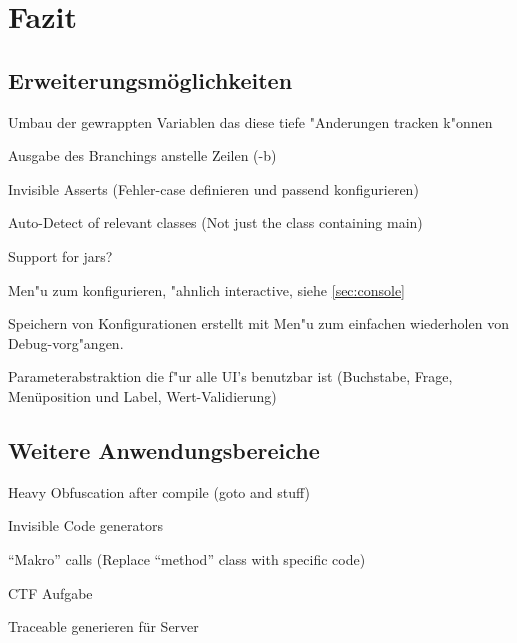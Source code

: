 
\chapter{Fazit}



\section{Erweiterungsmöglichkeiten} 

Umbau der gewrappten Variablen das diese tiefe "Anderungen tracken k"onnen

Ausgabe des Branchings anstelle Zeilen (-b)

Invisible Asserts (Fehler-case definieren und passend konfigurieren)

Auto-Detect of relevant classes (Not just the class containing main)

Support for jars?

Men"u zum konfigurieren, "ahnlich interactive, siehe \ref{sec:console}

Speichern von Konfigurationen erstellt mit Men"u zum einfachen wiederholen von Debug-vorg"angen.

Parameterabstraktion die f"ur alle UI's benutzbar ist (Buchstabe, Frage, Menüposition und Label, Wert-Validierung)

\section{Weitere Anwendungsbereiche} 

Heavy Obfuscation after compile (goto and stuff)

Invisible Code generators

"`Makro"' calls (Replace "`method"' class with specific code)

CTF Aufgabe

Traceable generieren für Server
